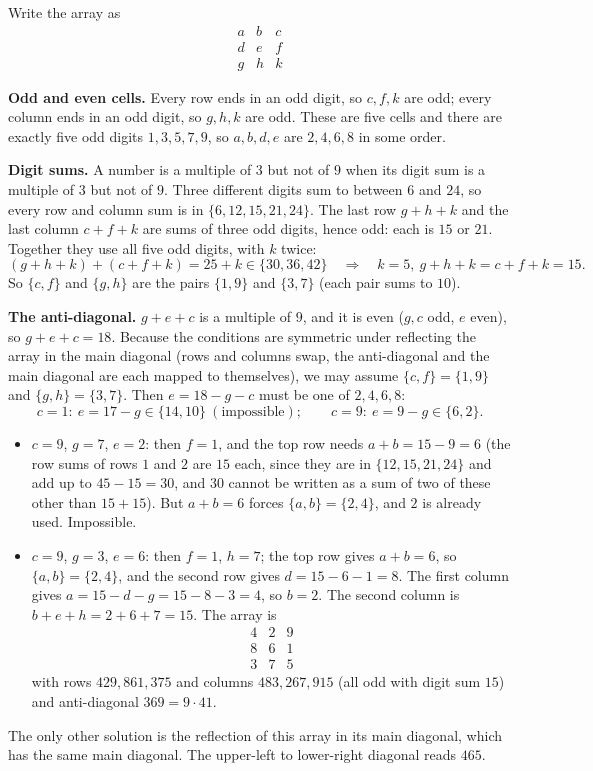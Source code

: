 Write the array as
\[
\begin{array}{ccc} a&b&c\\ d&e&f\\ g&h&k \end{array}
\]

\textbf{Odd and even cells.} Every row ends in an odd digit, so $c,f,k$ are odd; every column ends in an odd digit, so $g,h,k$ are odd. These are five cells and there are exactly five odd digits $1,3,5,7,9$, so $a,b,d,e$ are $2,4,6,8$ in some order.

\textbf{Digit sums.} A number is a multiple of $3$ but not of $9$ when its digit sum is a multiple of $3$ but not of $9$. Three different digits sum to between $6$ and $24$, so every row and column sum is in $\{6,12,15,21,24\}$. The last row $g+h+k$ and the last column $c+f+k$ are sums of three odd digits, hence odd: each is $15$ or $21$. Together they use all five odd digits, with $k$ twice:
\[
(g+h+k)+(c+f+k)=25+k\in\{30,36,42\}\quad\Longrightarrow\quad k=5,\ g+h+k=c+f+k=15 .
\]
So $\{c,f\}$ and $\{g,h\}$ are the pairs $\{1,9\}$ and $\{3,7\}$ (each pair sums to $10$).

\textbf{The anti-diagonal.} $g+e+c$ is a multiple of $9$, and it is even ($g,c$ odd, $e$ even), so $g+e+c=18$. Because the conditions are symmetric under reflecting the array in the main diagonal (rows and columns swap, the anti-diagonal and the main diagonal are each mapped to themselves), we may assume $\{c,f\}=\{1,9\}$ and $\{g,h\}=\{3,7\}$. Then $e=18-g-c$ must be one of $2,4,6,8$:
\[
c=1:\ e=17-g\in\{14,10\}\ (\text{impossible});\qquad c=9:\ e=9-g\in\{6,2\}.
\]
\begin{itemize}
\item $c=9$, $g=7$, $e=2$: then $f=1$, and the top row needs $a+b=15-9=6$ (the row sums of rows $1$ and $2$ are $15$ each, since they are in $\{12,15,21,24\}$ and add up to $45-15=30$, and $30$ cannot be written as a sum of two of these other than $15+15$). But $a+b=6$ forces $\{a,b\}=\{2,4\}$, and $2$ is already used. Impossible.
\item $c=9$, $g=3$, $e=6$: then $f=1$, $h=7$; the top row gives $a+b=6$, so $\{a,b\}=\{2,4\}$, and the second row gives $d=15-6-1=8$. The first column gives $a=15-d-g=15-8-3=4$, so $b=2$. The second column is $b+e+h=2+6+7=15$. The array is
\[
\begin{array}{ccc} 4&2&9\\ 8&6&1\\ 3&7&5 \end{array}
\]
with rows $429,861,375$ and columns $483,267,915$ (all odd with digit sum $15$) and anti-diagonal $369=9\cdot41$.
\end{itemize}
The only other solution is the reflection of this array in its main diagonal, which has the same main diagonal. The upper-left to lower-right diagonal reads $\boxed{465}$.
